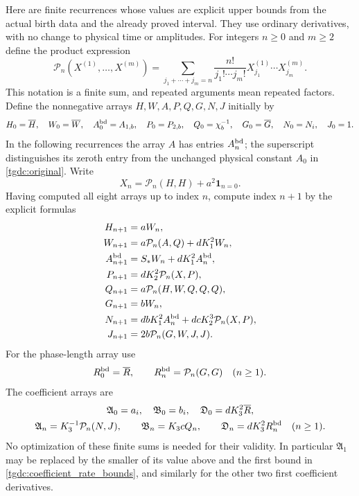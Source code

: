 Here are finite recurrences whose values are explicit upper bounds
from the actual birth data and the already proved interval. They use
ordinary derivatives, with no change to physical time or amplitudes.
For integers $n\geq0$ and $m\geq2$ define the product expression
\[
 \mathcal P_n(X^{(1)},\ldots,X^{(m)})
 =\sum_{j_1+\cdots+j_m=n}
       \frac{n!}{j_1!\cdots j_m!}
       X^{(1)}_{j_1}\cdots X^{(m)}_{j_m}.
\]
This notation is a finite sum, and repeated arguments mean repeated
factors. Define the nonnegative arrays $H,W,A,P,Q,G,N,J$ initially by
\begin{equation}\label{tgdc:majorant_initial}
\begin{gathered}
 H_0=\overline H,\quad W_0=\overline W,\quad
 A_0^{\rm bd}=A_{1,b},\quad P_0=P_{2,b},\quad
 Q_0=\chi_b^{-1},\quad G_0=\overline G,\quad
 N_0=N_i,\quad J_0=1.
\end{gathered}
\end{equation}
In the following recurrences the array $A$ has entries $A_n^{\rm bd}$;
the superscript distinguishes its zeroth entry from the unchanged
physical constant $A_0$ in \eqref{tgdc:original}. Write
\[
 X_n=\mathcal P_n(H,H)+a^2\mathbf1_{n=0}.
\]
Having computed all eight arrays up to index $n$, compute index $n+1$
by the explicit formulas
\begin{equation}\label{tgdc:parent_majorants}
\begin{aligned}
 H_{n+1}&=aW_n,\\
 W_{n+1}&=a\mathcal P_n(A,Q)+dK_1^2W_n,\\
 A_{n+1}^{\rm bd}&=S_*W_n+dK_1^2A_n^{\rm bd},\\
 P_{n+1}&=dK_2^2\mathcal P_n(X,P),\\
 Q_{n+1}&=a\mathcal P_n(H,W,Q,Q,Q),\\
 G_{n+1}&=bW_n,\\
 N_{n+1}&=dbK_1^2A_n^{\rm bd}
                 +dcK_2^3\mathcal P_n(X,P),\\
 J_{n+1}&=2b\mathcal P_n(G,W,J,J).
\end{aligned}
\end{equation}
For the phase-length array use
\[
 R_0^{\rm bd}=\overline R,\qquad
 R_n^{\rm bd}=\mathcal P_n(G,G)\quad(n\geq1).
\]
The coefficient arrays are
\begin{equation}\label{tgdc:coefficient_majorants}
\begin{gathered}
 \mathfrak A_0=a_i,\quad \mathfrak B_0=b_i,\quad
 \mathfrak D_0=dK_3^2\overline R,\\
 \mathfrak A_n=K_3^{-1}\mathcal P_n(N,J),\qquad
 \mathfrak B_n=K_3cQ_n,\qquad
 \mathfrak D_n=dK_3^2R_n^{\rm bd}\quad(n\geq1).
\end{gathered}
\end{equation}
No optimization of these finite sums is needed for their validity.
In particular $\mathfrak A_1$ may be replaced by the smaller of its
value above and the first bound in \eqref{tgdc:coefficient_rate_bounds},
and similarly for the other two first coefficient derivatives.

